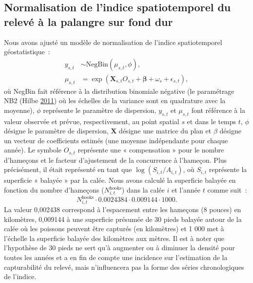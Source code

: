 \documentclass[french,11pt]{book}
\begin{document}
\hypertarget{sec:hbll-spatiotemporal}{%
\subsection{Normalisation de l'indice spatiotemporel du relevé à la palangre sur fond dur}\label{sec:hbll-spatiotemporal}}

Nous avons ajusté un modèle de normalisation de l'indice spatiotemporel géostatistique~:
\begin{align}
  y_{s,t} &\sim \mathrm{NegBin}\left(\mu_{s,t}, \phi \right),\\
  \mu_{s,t} &= \exp \left( \bm{X}_{s,t} O_{s,t} + \bm{\beta} + \omega_s + \epsilon_{s,t} \right),
\label{eq:hbll-model}
\end{align}
où NegBin fait référence à la distribution binomiale négative (le paramétrage NB2 (Hilbe \protect\hyperlink{ref-hilbe2011}{2011}) où les échelles de la variance sont en quadrature avec la moyenne), \(\phi\) représente le paramètre de dispersion, \(y_{s,t}\) et \(\mu_{s,t}\) font référence à la valeur observée et prévue, respectivement, au point spatial \(s\) et dans le temps \(t\), \(\phi\) désigne le paramètre de dispersion, \(\bm{X}\) désigne une matrice du plan et \(\beta\) désigne un vecteur de coefficients estimés (une moyenne indépendante pour chaque année). Le symbole \(O_{s,t}\) représente une « compensation » pour le nombre d'hameçons et le facteur d'ajustement de la concurrence à l'hameçon. Plus précisément, il était représenté en tant que \(\log \left(S_{i,t} / A_{i,t} \right)\), où \(S_{i,t}\) représente la superficie « balayée » par la calée. Nous avons calculé la superficie balayée en fonction du nombre d'hameçons (\(N^\textrm{hooks}_{i,t}\)) dans la calée \(i\) et l'année \(t\) comme suit~:
\begin{equation}
N^\textrm{hooks}_{i,t} \cdot 0.0024384 \cdot 0.009144 \cdot 1000.
\end{equation}
La valeur 0,002438 correspond à l'espacement entre les hameçons (8 pouces) en kilomètres, 0,009144 à une superficie présumée de 30 pieds balayée autour de la calée où les poissons peuvent être capturés (en kilomètres) et 1 000 met à l'échelle la superficie balayée des kilomètres aux mètres. Il est à noter que l'hypothèse de 30 pieds ne sert qu'à augmenter ou à diminuer la densité pour toutes les années et a en fin de compte une incidence sur l'estimation de la capturabilité du relevé, mais n'influencera pas la forme des séries chronologiques de l'indice.
\end{document}
